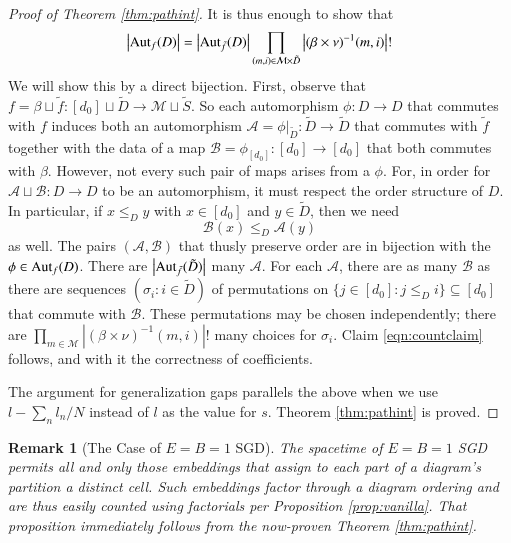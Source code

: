 \documentclass[anon,12pt]{colt2021} %
\newtheorem{rmk}{Remark}
\newcommand{\wabs}[1]{\left|#1\right|}
\newcommand{\Aut}{\text{\textnormal{Aut}}}
\newcommand{\Aa}{\mathcal{A}}
\newcommand{\Bb}{\mathcal{B}}
\newcommand{\Mm}{\mathcal{M}}
\begin{document}
\begin{proof}[Proof of Theorem \ref{thm:pathint}]
            It is thus enough to show that
            \begin{align*} \label{eqn:countclaim}
                \wabs{\Aut_f(D)} = 
                \wabs{\Aut_{\tilde f}(D)}
                \prod_{(m, i) \in \Mm \times \tilde D}
                    \wabs{(\beta \times \nu)^{-1}(m, i)}!
            \end{align*}
            We will show this by a direct bijection.  First, observe that
            $
                f = \beta \sqcup \tilde f:
                    [d_0] \sqcup \tilde D \to \Mm \sqcup \tilde S
            $. 
            So each automorphism $\phi: D\to D$ that commutes with $f$ induces
            both an automorphism
            $
                \Aa = \phi|_{\tilde D}: \tilde D\to \tilde D
            $
            that commutes with $\tilde f$ together with the data of a map
            $
                \Bb = \phi_{[d_0]}: [d_0] \to [d_0] 
            $
            that both commutes with $\beta$.  However, not every such pair of
            maps arises from a $\phi$.  For, in order for $\Aa \sqcup \Bb: D
            \to D$ to be an automorphism, it must respect the order structure
            of $D$.  In particular, if $x\leq_D y$ with $x \in [d_0]$ and $y
            \in \tilde D$, then we need
            $$
                \Bb(x) \leq_D \Aa(y)
            $$
            as well.  The
            pairs $(\Aa, \Bb)$ that thusly preserve order are in bijection with
            the $\phi \in \Aut_f(D)$.  There are $\wabs{\Aut_{\tilde f}(\tilde
            D)}$ many $\Aa$.  For each $\Aa$, there are as many $\Bb$ as there
            are sequences $(\sigma_i: i \in \tilde D)$ of permutations on
            $
                \{j\in [d_0]: j\leq_D i\} \subseteq [d_0]
            $ 
            that commute with $\Bb$.  These permutations may be chosen
            independently; there are 
            $
                \prod_{m\in \Mm}
                    \wabs{(\beta \times \nu)^{-1}(m, i)}!
            $
            many choices for $\sigma_i$.  Claim \ref{eqn:countclaim} follows,
            and with it the correctness of coefficients.
 
            The argument for generalization gaps parallels the above when we
            use $l-\sum_n l_n/N$ instead of $l$ as the value for $s$. 
            Theorem \ref{thm:pathint} is proved.
        \end{proof}

        \begin{rmk}[The Case of $E=B=1$ SGD]
            The spacetime of $E=B=1$ SGD permits all and only those
            embeddings that assign to each part of a diagram's partition  a
            distinct cell.  Such embeddings factor through a diagram
            ordering and are thus easily counted using factorials per
            Proposition \ref{prop:vanilla}.  That proposition immediately
            follows from the now-proven Theorem \ref{thm:pathint}.
        \end{rmk}
\end{document}
